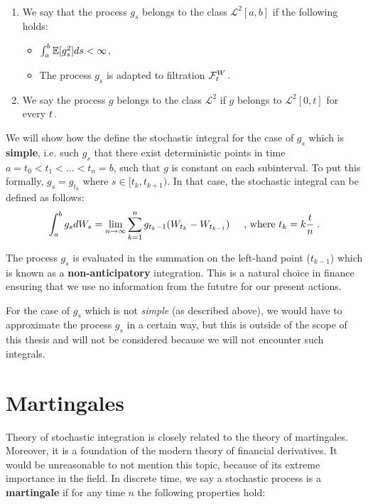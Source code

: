 \documentclass[times, utf8, diplomski]{fer}
\begin{document}
\begin{definition}~\\
\begin{enumerate}[label=(\roman*)]
	\item We say that the process $g_s$ belongs to the class $\mathcal{L}^2[a,b]$ if the following holds:
	\begin{itemize}
		\item $ \int_a^b\mathbb{E}[g_s^2]ds < \infty\hspace{0.05cm},$
		\item The process $g_s$ is adapted to filtration $\mathcal{F}_t^W\hspace{0.05cm}.$
	\end{itemize}
	\item We say the process $g$ belongs to the class $\mathcal{L}^2$ if $g$ belongs to $\mathcal{L}^2[0,t]$ for every $t\hspace{0.05cm}.$
\end{enumerate}
\end{definition}

\noindent We will show how the define the stochastic integral for the case of $g_s$ which is \textbf{simple}, i.e. such $g_s$ that there exist deterministic points in time $a=t_0 < t_1 < ... < t_n = b$, such that $g$ is constant on each subinterval. To put this formally, $g_s=g_{t_k}$ where $s \in [t_k,t_{k+1})$. In that case, the stochastic integral can be defined as follows:
$$ \int_a^bg_sdW_s = \lim_{n\rightarrow\infty} \sum_{k=1}^n g_{t_k-1}(W_{t_k} - W_{t_{k-1}}) \hspace{0.5cm} \text{, where } t_k = k\frac{t}{n}\hspace{0.1cm}.$$

\noindent The process $g_s$ is evaluated in the summation on the left-hand point ($t_{k-1}$) which is known as a \textbf{non-anticipatory} integration. This is a natural choice in finance ensuring that we use no information from the fututre for our present actions.

\noindent For the case of $g_s$ which is not \textit{simple} (as described above), we would have to approximate the process $g_s$ in a certain way, but this is outside of the scope of this thesis and will not be considered because we will not encounter such integrals.

\section{Martingales}
Theory of stochastic integration is closely related to the theory of martingales. Moreover, it is a foundation of the modern theory of financial derivatives. It would be unreasonable to not mention this topic, because of its extreme importance in the field. In discrete time, we say a stochastic process is a \textbf{martingale} if for any time $n$ the following properties hold: \vspace{0.5cm}
\end{document}
